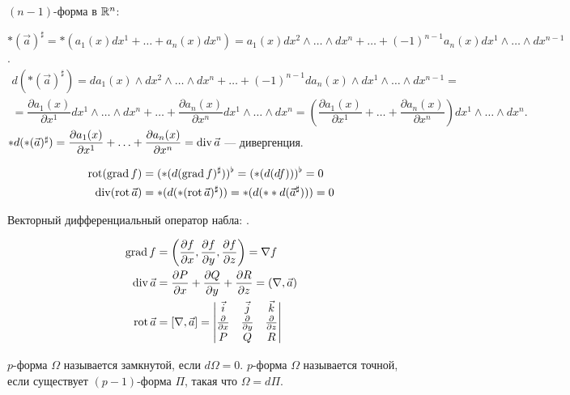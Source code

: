 $(n-1)$-форма в $\mathbb{R}^n$:

$*(\vec{a})^\sharp=*(a_1(x)dx^1+\ldots+a_n(x)dx^n)=a_1(x)dx^2\wedge\ldots\wedge dx^n+\ldots+(-1)^{n-1}a_n(x)dx^1\wedge\ldots\wedge dx^{n-1}$.
\begin{multline*}
	d(*(\vec{a})^\sharp)=da_1(x)\wedge dx^2\wedge\ldots\wedge dx^n+\ldots+(-1)^{n-1}da_n(x)\wedge dx^1\wedge\ldots\wedge dx^{n-1}=\\=\dfrac{\partial a_1(x)}{\partial x^1}dx^1\wedge\ldots\wedge dx^n+\ldots+\dfrac{\partial a_n(x)}{\partial x^n}dx^1\wedge\ldots\wedge dx^n=\left(\dfrac{\partial a_1(x)}{\partial x^1}+\ldots + \dfrac{\partial a_n(x)}{\partial x^n}\right)dx^1\wedge\ldots\wedge dx^n.
\end{multline*}
$*d(*(\vec{a})^\sharp)=\dfrac{\partial a_1(x)}{\partial x^1}+\ldots+\dfrac{\partial a_n(x)}{\partial x^n}=\operatorname{div}\vec{a}$ --- дивергенция.

\begin{example}
	\begin{align*}
		\operatorname{rot}(\operatorname{grad} f)&=(*(d(\operatorname{grad} f)^\sharp))^\flat=(*(d(df)))^\flat=0\\
		\operatorname{div}(\operatorname{rot}\vec{a})&=*(d(*(\operatorname{rot}\vec{a})^\sharp))=*(d(**d(\vec{a}^\sharp)))=0
	\end{align*}
\end{example}

Векторный дифференциальный оператор набла: .

\begin{align*}
	\operatorname{grad} f&= \left(\dfrac{\partial f}{\partial x}, \dfrac{\partial f}{\partial y}, \dfrac{\partial f}{\partial z}\right)=\nabla f\\
	\operatorname{div}\vec{a}&=\dfrac{\partial P}{\partial x}+\dfrac{\partial Q}{\partial y}+\dfrac{\partial R}{\partial z}=(\nabla, \vec{a})\\
	\operatorname{rot}\vec{a}&=[\nabla, \vec{a}]=
	\begin{vmatrix}
		\vec{i} & \vec{j} & \vec{k}\\
		\frac{\partial}{\partial x} & \frac{\partial}{\partial y} & \frac{\partial}{\partial z}\\
		P & Q & R
	\end{vmatrix}
\end{align*}


\begin{Def}
	$p$-форма $\Omega$ называется замкнутой, если $d\Omega=0$. $p$-форма $\Omega$ называется точной, если существует $(p-1)$-форма $\Pi$, такая что $\Omega=d\Pi$.
\end{Def}

